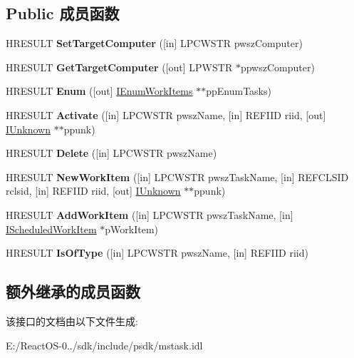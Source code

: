\subsection*{Public 成员函数}
\begin{DoxyCompactItemize}
\item 
\mbox{\label{interface_i_task_scheduler_a3a88ca7eba1678139079dec2e1a40d7c}} 
H\+R\+E\+S\+U\+LT {\bfseries Set\+Target\+Computer} (\mbox{[}in\mbox{]} L\+P\+C\+W\+S\+TR pwsz\+Computer)
\item 
\mbox{\label{interface_i_task_scheduler_a01c0cca065f8807a088a075d9b54a0d6}} 
H\+R\+E\+S\+U\+LT {\bfseries Get\+Target\+Computer} (\mbox{[}out\mbox{]} L\+P\+W\+S\+TR $\ast$ppwsz\+Computer)
\item 
\mbox{\label{interface_i_task_scheduler_abf56bf88d7d58a1e24e0ee7ea6aaa820}} 
H\+R\+E\+S\+U\+LT {\bfseries Enum} (\mbox{[}out\mbox{]} \hyperlink{interface_i_enum_work_items}{I\+Enum\+Work\+Items} $\ast$$\ast$pp\+Enum\+Tasks)
\item 
\mbox{\label{interface_i_task_scheduler_aaed0c26631c494246c8c7e7bfb6041f0}} 
H\+R\+E\+S\+U\+LT {\bfseries Activate} (\mbox{[}in\mbox{]} L\+P\+C\+W\+S\+TR pwsz\+Name, \mbox{[}in\mbox{]} R\+E\+F\+I\+ID riid, \mbox{[}out\mbox{]} \hyperlink{interface_i_unknown}{I\+Unknown} $\ast$$\ast$ppunk)
\item 
\mbox{\label{interface_i_task_scheduler_ad7b66c4fbbac03cedb19dace5373b332}} 
H\+R\+E\+S\+U\+LT {\bfseries Delete} (\mbox{[}in\mbox{]} L\+P\+C\+W\+S\+TR pwsz\+Name)
\item 
\mbox{\label{interface_i_task_scheduler_aded0e03a9076ab0656f15c1886c7aab4}} 
H\+R\+E\+S\+U\+LT {\bfseries New\+Work\+Item} (\mbox{[}in\mbox{]} L\+P\+C\+W\+S\+TR pwsz\+Task\+Name, \mbox{[}in\mbox{]} R\+E\+F\+C\+L\+S\+ID rclsid, \mbox{[}in\mbox{]} R\+E\+F\+I\+ID riid, \mbox{[}out\mbox{]} \hyperlink{interface_i_unknown}{I\+Unknown} $\ast$$\ast$ppunk)
\item 
\mbox{\label{interface_i_task_scheduler_a7f120e136b123892a823dc3d00f376f6}} 
H\+R\+E\+S\+U\+LT {\bfseries Add\+Work\+Item} (\mbox{[}in\mbox{]} L\+P\+C\+W\+S\+TR pwsz\+Task\+Name, \mbox{[}in\mbox{]} \hyperlink{interface_i_scheduled_work_item}{I\+Scheduled\+Work\+Item} $\ast$p\+Work\+Item)
\item 
\mbox{\label{interface_i_task_scheduler_ada064712f45d34e99a20f8f55bc2c699}} 
H\+R\+E\+S\+U\+LT {\bfseries Is\+Of\+Type} (\mbox{[}in\mbox{]} L\+P\+C\+W\+S\+TR pwsz\+Name, \mbox{[}in\mbox{]} R\+E\+F\+I\+ID riid)
\end{DoxyCompactItemize}
\subsection*{额外继承的成员函数}


该接口的文档由以下文件生成\+:\begin{DoxyCompactItemize}
\item 
E\+:/\+React\+O\+S-\/0../sdk/include/psdk/mstask.\+idl\end{DoxyCompactItemize}
